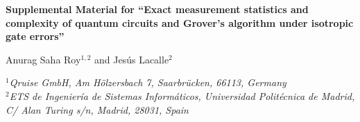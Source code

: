 \documentclass[aps,pra,twocolumn,superscriptaddress,10pt,floatfix]{revtex4-2}
\begin{document}


\clearpage
\onecolumngrid
\begin{center}
{\large\bfseries Supplemental Material for ``Exact measurement statistics and complexity of quantum circuits and Grover's algorithm under isotropic gate errors''\par}
\vspace{4pt}
{\normalsize Anurag Saha Roy$^{1,2}$ and Jes\'us Lacalle$^2$}\\[3pt]
{\small\itshape $^1$Qruise GmbH, Am H\"olzersbach 7, Saarbr\"ucken, 66113, Germany\\
$^2$ETS de Ingenier\'ia de Sistemas Inform\'aticos, Universidad Polit\'ecnica de Madrid, C/ Alan Turing s/n, Madrid, 28031, Spain\par}
\end{center}
\vspace{6pt}

\setcounter{section}{0}
\setcounter{subsection}{0}
\setcounter{equation}{0}
\setcounter{figure}{0}
\setcounter{table}{0}
\makeatletter
\renewcommand{\p@subsection}{}
\makeatother
\renewcommand{\thesection}{S\arabic{section}}
\renewcommand{\thesubsection}{S\arabic{section}.\Alph{subsection}}
\renewcommand{\theequation}{S\arabic{equation}}
\renewcommand{\thefigure}{S\arabic{figure}}
\renewcommand{\thetable}{S\arabic{table}}
\renewcommand{\theHsection}{S\arabic{section}}
\renewcommand{\theHsubsection}{S\arabic{section}.\Alph{subsection}}
\renewcommand{\theHequation}{S\arabic{equation}}
\renewcommand{\theHfigure}{S\arabic{figure}}
\renewcommand{\theHtable}{S\arabic{table}}



\end{document}
